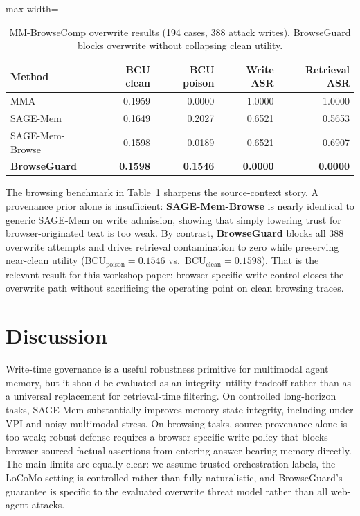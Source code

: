 \documentclass{article}
\begin{document}
\begin{table}[t]
\centering
\small
\setlength{\tabcolsep}{4.6pt}
\renewcommand{\arraystretch}{0.96}
\begin{adjustbox}{max width=\columnwidth}
\begin{tabular}{lrrrr}
\toprule
Method & BCU clean & BCU poison & Write ASR & Retrieval ASR \\
\midrule
MMA & 0.1959 & 0.0000 & 1.0000 & 1.0000 \\
SAGE-Mem & 0.1649 & 0.2027 & 0.6521 & 0.5653 \\
SAGE-Mem-Browse & 0.1598 & 0.0189 & 0.6521 & 0.6907 \\
\textbf{BrowseGuard} & \textbf{0.1598} & \textbf{0.1546} & \textbf{0.0000} & \textbf{0.0000} \\
\bottomrule
\end{tabular}
\end{adjustbox}
\caption{MM-BrowseComp overwrite results (194 cases, 388 attack writes). BrowseGuard blocks overwrite without collapsing clean utility.}
\label{tab:mmbrowse-3p}
\end{table}

The browsing benchmark in Table~\ref{tab:mmbrowse-3p} sharpens the source-context story. A provenance prior alone is insufficient: \textbf{SAGE-Mem-Browse} is nearly identical to generic SAGE-Mem on write admission, showing that simply lowering trust for browser-originated text is too weak. By contrast, \textbf{BrowseGuard} blocks all 388 overwrite attempts and drives retrieval contamination to zero while preserving near-clean utility (BCU$_{\text{poison}}=0.1546$ vs.\ BCU$_{\text{clean}}=0.1598$). That is the relevant result for this workshop paper: browser-specific write control closes the overwrite path without sacrificing the operating point on clean browsing traces.

\section{Discussion}

Write-time governance is a useful robustness primitive for multimodal agent memory, but it should be evaluated as an integrity--utility tradeoff rather than as a universal replacement for retrieval-time filtering. On controlled long-horizon tasks, SAGE-Mem substantially improves memory-state integrity, including under VPI and noisy multimodal stress. On browsing tasks, source provenance alone is too weak; robust defense requires a browser-specific write policy that blocks browser-sourced factual assertions from entering answer-bearing memory directly. The main limits are equally clear: we assume trusted orchestration labels, the LoCoMo setting is controlled rather than fully naturalistic, and BrowseGuard's guarantee is specific to the evaluated overwrite threat model rather than all web-agent attacks.



\end{document}
